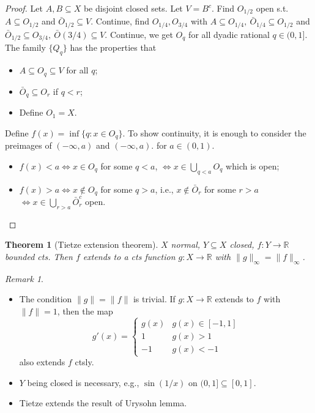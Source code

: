 \documentclass{article}
\theoremstyle{definition}
\theoremstyle{remark}
\newtheorem{rem}{Remark}
\theoremstyle{plain}
\newtheorem{thm}[defn]{Theorem}
\newcommand{\RR}{\mathbb{R}}
\begin{document}
\begin{proof}
    Let $A,B\subseteq X$ be disjoint closed sets. Let $V=B^c$. Find $O_{1/2}$ open s.t. $A\subseteq O_{1/2}$ and $\bar O_{1/2}\subseteq V$. Continue, find $O_{1/4}, O_{3/4}$ with $A\subseteq O_{1/4},\ \bar O_{1/4}\subseteq O_{1/2}$ and $\bar O_{1/2}\subseteq O_{3/4},\ \bar O(3/4)\subseteq V$. Continue, we get $O_q$ for all dyadic rational $q\in (0,1]$. The family $\{Q_q\}$ has the properties that
    \begin{itemize}
        \item $A\subseteq O_q\subseteq V$ for all $q$;
        \item $\bar O_q\subseteq O_r$ if $q<r$;
        \item Define $O_1=X$.
    \end{itemize}
    Define $f(x)=\inf\{q:x\in O_q\}$. To show continuity, it is enough to consider the preimages of $(-\infty,a)$ and $(-\infty,a)$. for $a\in(0,1)$.
    \begin{itemize}
        \item $f(x)<a\Leftrightarrow x\in O_q$ for some $q<a$, $\Leftrightarrow x\in\bigcup_{q<a}O_q$ which is open;
        \item $f(x)>a\Leftrightarrow x\not\in O_q$ for some $q>a$, i.e., $x\not\in\bar O_r$ for some $r>a$ $\Leftrightarrow x\in\bigcup_{r>a}\bar O_r^c$ open.
    \end{itemize}
\end{proof}
\begin{thm}[Tietze extension theorem]
    $X$ normal, $Y\subseteq X$ closed, $f:Y\to \RR$ bounded cts. Then $f$ extends to a cts function $g:X\to \RR$ with $\|g\|_\infty=\|f\|_\infty$.
\end{thm}
\begin{rem}
    \begin{itemize}
        \item The condition $\|g\|=\|f\|$ is trivial. If $g:X\to\RR$ extends to $f$ with $\|f\|=1$, then the map \[g'(x)=\begin{cases}
            g(x) & g(x)\in[-1,1]\\
            1 & g(x)>1\\
            -1 & g(x)<-1
        \end{cases}\]
        also extends $f$ ctsly.
        \item $Y$ being closed is necessary, e.g., $\sin(1/x)$ on $(0,1]\subseteq[0,1]$.
        \item Tietze extends the result of Urysohn lemma.
    \end{itemize}
\end{rem}
\end{document}
